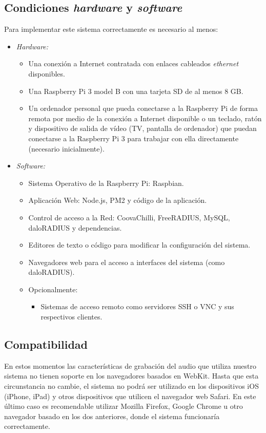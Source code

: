 \subsection*{Condiciones \emph{hardware} y \emph{software}}

Para implementar este sistema correctamente es necesario al menos:
\begin{itemize}
\item \emph{Hardware:}
\begin{itemize}
\item Una conexión a Internet contratada con enlaces cableados \emph{ethernet} disponibles.
\item Una Raspberry Pi 3 model B con una tarjeta SD de al menos 8 GB.
\item Un ordenador personal que pueda conectarse a la Raspberry Pi de forma remota por medio de la conexión a Internet disponible o un teclado, ratón y dispositivo de salida de vídeo (TV, pantalla de ordenador) que puedan conectarse a la Raspberry Pi 3 para trabajar con ella directamente (necesario inicialmente).
\end{itemize}
\item \emph{Software:}
\begin{itemize}
\item Sistema Operativo de la Raspberry Pi: Raspbian.
\item Aplicación Web: Node.js, PM2 y código de la aplicación.
\item Control de acceso a la Red: CoovaChilli, FreeRADIUS, MySQL, daloRADIUS y dependencias.
\item Editores de texto o código para modificar la configuración del sistema.
\item Navegadores web para el acceso a interfaces del sistema (como daloRADIUS).
\item Opcionalmente:
\begin{itemize}
\item Sistemas de acceso remoto como servidores \acrshort{SSH} o \acrshort{VNC} y sus respectivos clientes.
\end{itemize}
\end{itemize}
\end{itemize}

\subsection*{Compatibilidad}

En estos momentos las características de grabación del audio que utiliza nuestro sistema no tienen soporte en los navegadores basados en WebKit. Hasta que esta circunstancia no cambie, el sistema no podrá ser utilizado en los dispositivos iOS (iPhone, iPad) y otros dispositivos que utilicen el navegador web Safari. En este último caso es recomendable utilizar Mozilla Firefox, Google Chrome u otro navegador basado en los dos anteriores, donde el sistema funcionaría correctamente.
